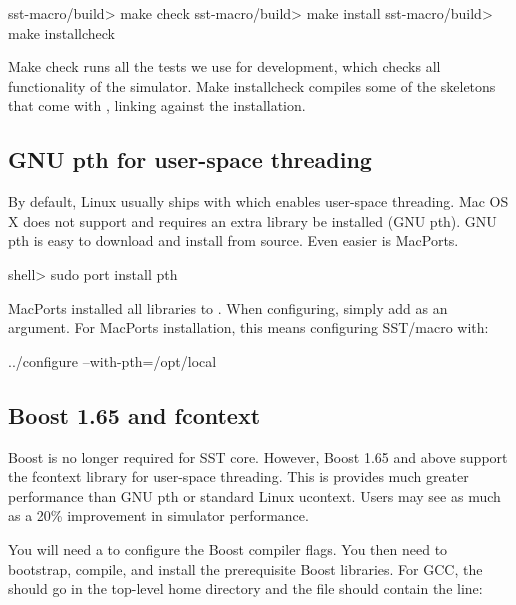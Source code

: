 \begin{ShellCmd}
sst-macro/build> make check
sst-macro/build> make install
sst-macro/build> make installcheck
\end{ShellCmd}
Make check runs all the tests we use for development, which checks all functionality of the simulator.  
Make installcheck compiles some of the skeletons that come with \sstmacro, linking against the installation.  


\subsection{GNU pth for user-space threading}\label{subsubsec:pth}
By default, Linux usually ships with  which enables user-space threading.
Mac OS X does not support  and requires an extra library be installed (GNU pth).
GNU pth is easy to download and install from source.
Even easier is MacPorts. 

\begin{ShellCmd}
shell> sudo port install pth
\end{ShellCmd}

MacPorts installed all libraries to . 
When configuring, simply add  as an argument.
For MacPorts installation, this means configuring SST/macro with:

\begin{ShellCmd}
../configure --with-pth=/opt/local
\end{ShellCmd}

\subsection{Boost 1.65 and fcontext}\label{subsubsec:boost}
Boost is no longer required for SST core.
However, Boost 1.65 and above support the fcontext library for user-space threading.
This is provides much greater performance than GNU pth or standard Linux ucontext.
Users may see as much as a 20\% improvement in simulator performance.

You will need a  to configure the Boost compiler flags.
You then need to bootstrap, compile, and install the prerequisite Boost libraries. 
For GCC, the  should go in the top-level home directory and the file should contain the line:

